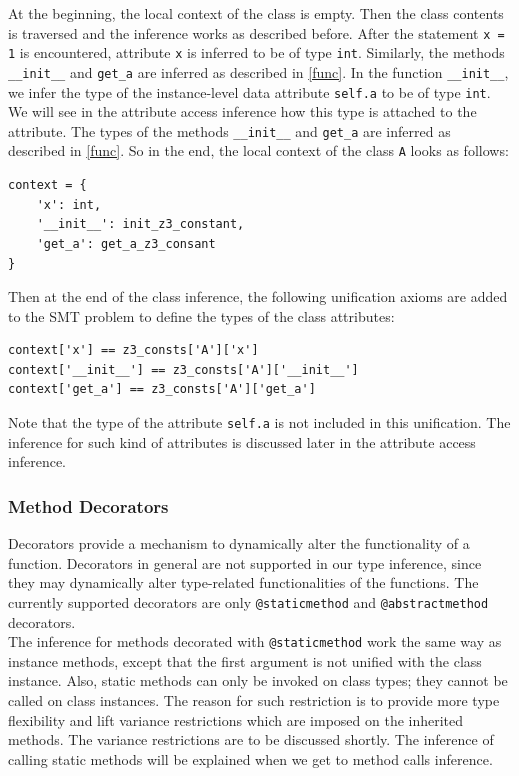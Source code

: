 At the beginning, the local context of the class is empty. Then the class contents is traversed and the inference works as described before. After the statement \lstinline|x = 1| is encountered, attribute \lstinline|x| is inferred to be of type \lstinline|int|. Similarly, the methods \lstinline|__init__| and \lstinline|get_a| are inferred as described in \ref{func}. In the function \lstinline|__init__|, we infer the type of the instance-level data attribute \lstinline|self.a| to be of type \lstinline|int|. We will see in the attribute access inference how this type is attached to the attribute. The types of the methods \lstinline|__init__| and \lstinline|get_a| are inferred as described in \ref{func}. So in the end, the local context of the class \lstinline|A| looks as follows:
\begin{lstlisting}
context = {
	'x': int,
	'__init__': init_z3_constant,
	'get_a': get_a_z3_consant
}
\end{lstlisting}

Then at the end of the class inference, the following unification axioms are added to the SMT problem to define the types of the class attributes:

\begin{lstlisting}
context['x'] == z3_consts['A']['x']
context['__init__'] == z3_consts['A']['__init__']
context['get_a'] == z3_consts['A']['get_a']
\end{lstlisting}

Note that the type of the attribute \lstinline|self.a| is not included in this unification. The inference for such kind of attributes is discussed later in the attribute access inference.

\subsubsection{Method Decorators}
Decorators provide a mechanism to dynamically alter the functionality of a function. Decorators in general are not supported in our type inference, since they may dynamically alter type-related functionalities of the functions. The currently supported decorators are only \lstinline|@staticmethod| and \lstinline|@abstractmethod| decorators. \\

The inference for methods decorated with \lstinline|@staticmethod| work the same way as instance methods, except that the first argument is not unified with the class instance. Also, static methods can only be invoked on class types; they cannot be called on class instances. The reason for such restriction is to provide more type flexibility and lift variance restrictions which are imposed on the inherited methods. The variance restrictions are to be discussed shortly. The inference of calling static methods will be explained when we get to method calls inference. \\

